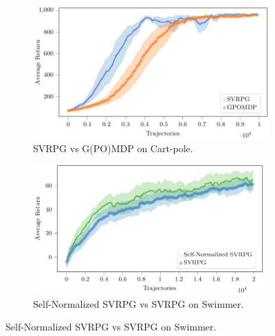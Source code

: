 \documentclass{article}
\theoremstyle{remark}
\theoremstyle{definition}
\begin{document}
\begin{figure}[t]
    \begin{subfigure}[b]{0.49\textwidth}
	\includegraphics[width=.98\textwidth]{images/cart_pole_SVRPG_vs_GPOMDP_tex.pdf}
	\vspace{-0.1in}
	\caption{SVRPG vs G(PO)MDP on Cart-pole.}
	\label{fig:cartpole}
    \end{subfigure}\hfill
    \begin{subfigure}[b]{0.49\textwidth}
	\includegraphics[width=0.98\textwidth]{swimmer_self_normalized_SVRPG_vs_SVRPG_tex.pdf}
	\vspace{-0.1in}
	\caption{Self-Normalized SVRPG vs SVRPG on Swimmer.}
	\label{fig:swimmertwo}
    \end{subfigure}
    

\end{figure}
\end{document}
